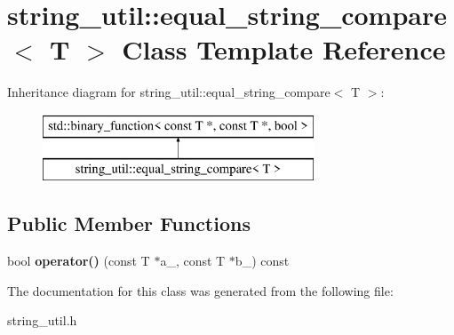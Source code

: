 \section{string\+\_\+util\+:\+:equal\+\_\+string\+\_\+compare$<$ T $>$ Class Template Reference}
\label{classstring__util_1_1equal__string__compare}
Inheritance diagram for string\+\_\+util\+:\+:equal\+\_\+string\+\_\+compare$<$ T $>$\+:\begin{figure}[H]
\begin{center}
\leavevmode
\includegraphics[height=2.000000cm]{classstring__util_1_1equal__string__compare}
\end{center}
\end{figure}
\subsection*{Public Member Functions}
\begin{DoxyCompactItemize}
\item 
bool {\bfseries operator()} (const T $\ast$a\+\_\+, const T $\ast$b\+\_\+) const \label{classstring__util_1_1equal__string__compare_aedfb40c0515b97043369af03da1d72ed}

\end{DoxyCompactItemize}


The documentation for this class was generated from the following file\+:\begin{DoxyCompactItemize}
\item 
string\+\_\+util.\+h\end{DoxyCompactItemize}
